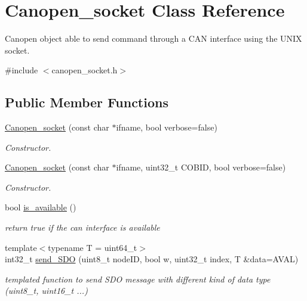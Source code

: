 \hypertarget{class_canopen__socket}{}\section{Canopen\+\_\+socket Class Reference}
\label{class_canopen__socket}


Canopen object able to send command through a C\+AN interface using the U\+N\+IX socket.  




{\ttfamily \#include $<$canopen\+\_\+socket.\+h$>$}

\subsection*{Public Member Functions}
\begin{DoxyCompactItemize}
\item 
\hyperlink{class_canopen__socket_a5ac330ffe00a414d7b2a1e393b3f2113}{Canopen\+\_\+socket} (const char $\ast$ifname, bool verbose=false)
\begin{DoxyCompactList}\small\item\em Constructor. \end{DoxyCompactList}\item 
\hyperlink{class_canopen__socket_a897638e8ede53e4302568a66c87eb914}{Canopen\+\_\+socket} (const char $\ast$ifname, uint32\+\_\+t C\+O\+B\+ID, bool verbose=false)
\begin{DoxyCompactList}\small\item\em Constructor. \end{DoxyCompactList}\item 
bool \hyperlink{class_canopen__socket_a57b7653675abfcaf690027f8d3fefc8c}{is\+\_\+available} ()
\begin{DoxyCompactList}\small\item\em return true if the can interface is available \end{DoxyCompactList}\item 
{\footnotesize template$<$typename T  = uint64\+\_\+t$>$ }\\int32\+\_\+t \hyperlink{class_canopen__socket_a07d81bd345670ed859cc07f21b8ecbe3}{send\+\_\+\+S\+DO} (uint8\+\_\+t node\+ID, bool w, uint32\+\_\+t index, T \&data=A\+V\+AL)
\begin{DoxyCompactList}\small\item\em templated function to send S\+DO message with different kind of data type (uint8\+\_\+t, uint16\+\_\+t ...) \end{DoxyCompactList}\item 

\end{DoxyCompactItemize}
